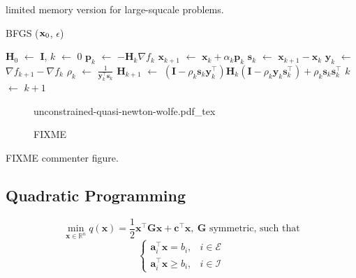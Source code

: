 limited memory version for large-squcale problems.

\begin{algorithm}
\caption{BFGS ($\mathbf{x}_0$, $\epsilon$)}
\label{alg:chap3-bfgs}
\begin{algorithmic}
\STATE $\mathbf{H}_0$ $\leftarrow$ $\mathbf{I}$, $k$ $\leftarrow$ $0$
\STATE $\mathbf{p}_k$ $\leftarrow$ $-\mathbf{H}_k\nabla f_k$
\STATE $\mathbf{x}_{k+1}$ $\leftarrow$ $\mathbf{x}_k + \alpha_k\mathbf{p}_k$
\STATE $\mathbf{s}_k$ $\leftarrow$ $\mathbf{x}_{k+1} - \mathbf{x}_k$
\STATE $\mathbf{y}_k$ $\leftarrow$ $\nabla f_{k+1} - \nabla f_k$
\STATE $\rho_k$ $\leftarrow$ $\frac{1}{\mathbf{y}_k^{\top}\mathbf{s}_k}$
\STATE $\mathbf{H}_{k+1}$ $\leftarrow$ $(\mathbf{I}-\rho_k\mathbf{s}_k\mathbf{y}_k^{\top})\mathbf{H}_k(\mathbf{I}-\rho_k\mathbf{y}_k\mathbf{s}_k^{\top})+\rho_k\mathbf{s}_k\mathbf{s}_k^{\top}$
\STATE $k$ $\leftarrow$ $k + 1$
\ENDWHILE
\end{algorithmic}
\end{algorithm}

\begin{figure}
  \centering
      {\def\svgwidth{0.9\linewidth}
        {\footnotesize
          
                     {unconstrained-quasi-newton-wolfe.pdf_tex}
        }
      }
      \caption{FIXME}
      \label{fig:chap3-unconstrained-quasi-newton-wolfe}
\end{figure}

FIXME commenter figure.

\subsection{Quadratic Programming}

\begin{equation}
\min_{\mathbf{x} \in \mathbb R^n}
q(\mathbf{x})=\frac{1}{2}\mathbf{x}^{\top}\mathbf{G}\mathbf{x}+\mathbf{c}^{\top}\mathbf{x},~\mathbf{G}\text{ symmetric, such that}
\end{equation}
\begin{equation}
\left\{\begin{array}{cc}
\mathbf{a}_i^{\top}\mathbf{x} = b_i, & i \in \mathcal{E} \\
\mathbf{a}_i^{\top}\mathbf{x} \ge b_i, & i \in \mathcal{I}
\end{array}\right.
\end{equation}

